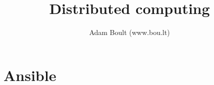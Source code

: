 \documentclass[oneside]{book}
\begin{document}
\author{Adam Boult (www.bou.lt)}
\title{Distributed computing}
\maketitle

\setcounter{tocdepth}{0}
\tableofcontents



\part{Ansible}

\end{document}
